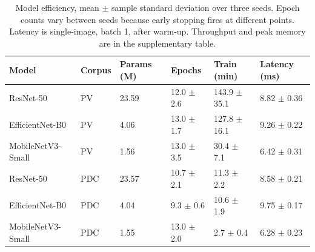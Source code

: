 \begin{table}[htbp]
\caption{Model efficiency, mean $\pm$ sample standard deviation over three seeds. Epoch counts vary between seeds because early stopping fires at different points. Latency is single-image, batch 1, after warm-up. Throughput and peak memory are in the supplementary table.}
\label{tab:efficiency-compact}
\footnotesize
\centering
\setlength{\tabcolsep}{3pt}
\begin{tabular}{llllll}
\toprule
Model & Corpus & Params (M) & Epochs & Train (min) & Latency (ms) \\
\midrule
ResNet-50 & PV & 23.59 & 12.0 $\pm$ 2.6 & 143.9 $\pm$ 35.1 & 8.82 $\pm$ 0.36 \\
EfficientNet-B0 & PV & 4.06 & 13.0 $\pm$ 1.7 & 127.8 $\pm$ 16.1 & 9.26 $\pm$ 0.22 \\
MobileNetV3-Small & PV & 1.56 & 13.0 $\pm$ 3.5 & 30.4 $\pm$ 7.1 & 6.42 $\pm$ 0.31 \\
ResNet-50 & PDC & 23.57 & 10.7 $\pm$ 2.1 & 11.3 $\pm$ 2.2 & 8.58 $\pm$ 0.21 \\
EfficientNet-B0 & PDC & 4.04 & 9.3 $\pm$ 0.6 & 10.6 $\pm$ 1.9 & 9.75 $\pm$ 0.17 \\
MobileNetV3-Small & PDC & 1.55 & 13.0 $\pm$ 2.0 & 2.7 $\pm$ 0.4 & 6.28 $\pm$ 0.23 \\
\bottomrule
\end{tabular}
\end{table}

